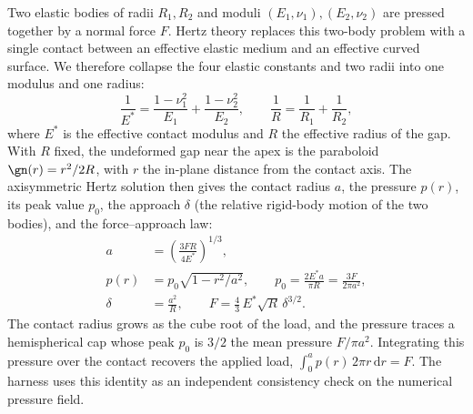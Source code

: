 Two elastic bodies of radii $R_1,R_2$ and moduli $(E_1,\nu_1),(E_2,\nu_2)$ are pressed
together by a normal force $F$. Hertz theory replaces this two-body problem with a single
contact between an effective elastic medium and an effective curved surface. We therefore
collapse the four elastic constants and two radii into one modulus and one radius:
\begin{equation}\label{eq:hertz-effective}
  \frac{1}{E^\ast}=\frac{1-\nu_1^2}{E_1}+\frac{1-\nu_2^2}{E_2},
  \qquad
  \frac{1}{R}=\frac{1}{R_1}+\frac{1}{R_2},
\end{equation}
where $E^\ast$ is the effective contact modulus and $R$ the effective radius of the gap.
With $R$ fixed, the undeformed gap near the apex is the paraboloid $\gn(r)=r^2/2R$, with
$r$ the in-plane distance from the contact axis. The axisymmetric Hertz solution
\citep{johnson1985contact} then gives the contact radius $a$, the pressure $p(r)$, its
peak value $p_0$, the approach $\delta$ (the relative rigid-body motion of the two bodies),
and the force--approach law:
\begin{align}
  a &= \left(\frac{3FR}{4E^\ast}\right)^{1/3}, \label{eq:hertz-a}\\
  p(r) &= p_0\sqrt{1-r^2/a^2}, \qquad
  p_0 = \frac{2E^\ast a}{\pi R} = \frac{3F}{2\pi a^2}, \label{eq:hertz-p}\\
  \delta &= \frac{a^2}{R}, \qquad
  F = \frac{4}{3}\,E^\ast\sqrt{R}\,\delta^{3/2}. \label{eq:hertz-force}
\end{align}
The contact radius grows as the cube root of the load, and the pressure traces a
hemispherical cap whose peak $p_0$ is $3/2$ the mean pressure $F/\pi a^2$. Integrating
this pressure over the contact recovers the applied load, $\int_0^a p(r)\,2\pi
r\,\mathrm{d}r = F$. The harness uses this identity as an independent consistency check on
the numerical pressure field.

